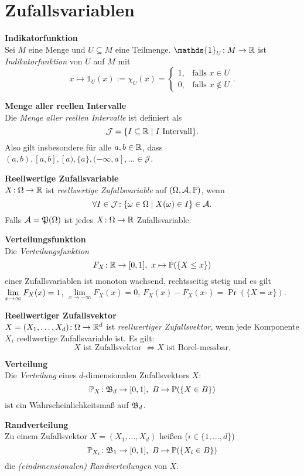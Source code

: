 \section{Zufallsvariablen}
\textbf{Indikatorfunktion}\\
Sei $M$ eine Menge und $U\subseteq M$ eine Teilmenge.
$\mathds{1}_U\!: M\to\R$ ist \textit{Indikatorfunktion} von $U$ auf $M$ mit
\[
  x\mapsto\mathds{1}_U(x):=\chi_U(x)=\begin{cases} 1, & \text{falls }x\in U \\ 0, & \text{falls }x\notin U \end{cases}.
\]

\textbf{Menge aller reellen Intervalle}\\
Die \textit{Menge aller reellen Intervalle} ist definiert als
\[
  \mathcal{J}=\{I\subseteq\mathbb{R} \mid I \text{ Intervall}\}.
\]
Also gilt insbesondere für alle $a,b\in\mathbb{R}$, dass $(a,b),[a,b],[a),\{a\},(-\infty,a],...\in\mathcal{J}$.

\textbf{Reellwertige Zufallsvariable}\\
$X\!: \Omega\to\mathbb{R}$ ist \textit{reellwertige Zufallsvariable} auf $(\Omega,\mathcal{A},\mathbb{P})$,
wenn
\[
  \forall I \in \mathcal{J}\!: \{\omega\in\Omega \mid X(\omega) \in I\} \in \mathcal{A}.
\]
Falls $\mathcal{A} = \mathfrak{P}(\Omega)$ ist jedes $X\!: \Omega\to\mathbb{R}$ Zufallsvariable.

\textbf{Verteilungsfunktion}\\
Die \textit{Verteilungsfunktion}
\[
  F_X\!: \mathbb{R} \to [0,1],\ x \mapsto \mathbb{P}(\{X \leq x\})
\]
einer Zufallsvariablen ist monoton wachsend, rechtsseitig stetig und es gilt\\
$\lim\limits_{x\to\infty} F_X(x) = 1$,
$\lim\limits_{x\to -\infty} F_X(x) = 0$,
$F_X(x) - F_X(x\textbf{-}) = \Pr(\{X = x\})$.

\textbf{Reellwertiger Zufallsvektor}\\
$X = (X_1,\ldots,X_d)\!: \Omega\to\mathbb{R}^d$ ist \textit{reellwertiger Zufallsvektor},
wenn jede Komponente $X_i$ reellwertige Zufallsvariable ist.
Es gilt:\\
\[
  X \text{ ist Zufallsvektor } \Leftrightarrow X \text{ ist Borel-messbar.}
\]

\textbf{Verteilung}\\
Die \textit{Verteilung} eines $d$-dimensionalen Zufallsvektors $X$:
\[
  \mathbb{P}_X\!: \mathfrak{B}_d \to [0,1],\ B \mapsto \mathbb{P}(\{X \in B\})
\]
ist ein Wahrscheinlichkeitsmaß auf $\mathfrak{B}_d$.

\textbf{Randverteilung}\\
Zu einem Zufallsvektor $X = (X_1,\ldots,X_d)$ heißen ($i\in\{1,\ldots,d\}$)
\[
  \mathbb{P}_{X_i}\!: \mathfrak{B}_1 \to [0,1],\ B \mapsto \mathbb{P}(\{X_i \in B\})
\]
die \textit{(eindimensionalen) Randverteilungen} von $X$.

